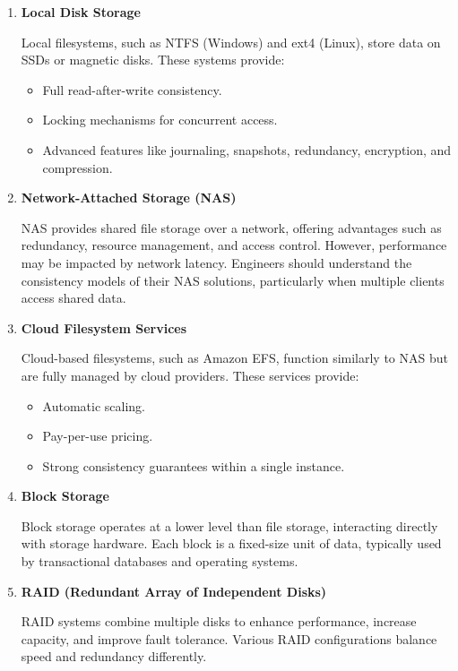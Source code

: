 \begin{enumerate}
    \item \textbf{Local Disk Storage}

    \noindent
    Local filesystems, such as NTFS (Windows) and ext4 (Linux), store data
    on SSDs or magnetic disks. These systems provide:
    \begin{itemize}
        \item Full read-after-write consistency.
        \item Locking mechanisms for concurrent access.
        \item Advanced features like journaling, snapshots, redundancy,
        encryption, and compression.
    \end{itemize}


    \item \textbf{Network-Attached Storage (NAS)}

    \noindent
    NAS provides shared file storage over a network, offering advantages
    such as redundancy, resource management, and access control. However,
    performance may be impacted by network latency. Engineers should understand
    the consistency models of their NAS solutions, particularly when multiple
    clients access shared data.


    \item \textbf{Cloud Filesystem Services}

    \noindent
    Cloud-based filesystems, such as Amazon EFS, function similarly to NAS but
    are fully managed by cloud providers. These services provide:
    \begin{itemize}
        \item Automatic scaling.
        \item Pay-per-use pricing.
        \item Strong consistency guarantees within a single instance.
    \end{itemize}


    \item \textbf{Block Storage}

    \noindent
    Block storage operates at a lower level than file storage, interacting directly
    with storage hardware. Each block is a fixed-size unit of data, typically used
    by transactional databases and operating systems.


    \item \textbf{RAID (Redundant Array of Independent Disks)}

    \noindent
    RAID systems combine multiple disks to enhance performance, increase capacity,
    and improve fault tolerance. Various RAID configurations balance speed and redundancy differently.



\end{enumerate}
